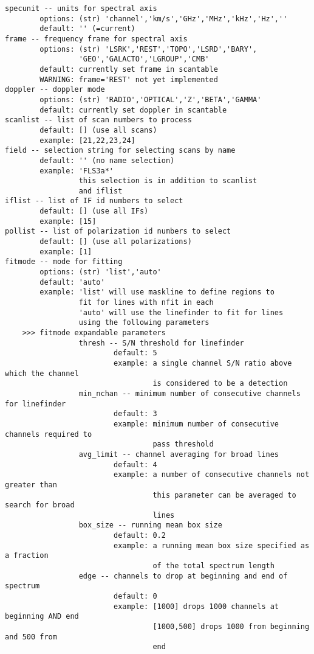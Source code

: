 \begin{verbatim}
specunit -- units for spectral axis
        options: (str) 'channel','km/s','GHz','MHz','kHz','Hz',''
        default: '' (=current)
frame -- frequency frame for spectral axis
        options: (str) 'LSRK','REST','TOPO','LSRD','BARY',
                 'GEO','GALACTO','LGROUP','CMB'
        default: currently set frame in scantable
        WARNING: frame='REST' not yet implemented
doppler -- doppler mode
        options: (str) 'RADIO','OPTICAL','Z','BETA','GAMMA'
        default: currently set doppler in scantable
scanlist -- list of scan numbers to process
        default: [] (use all scans)
        example: [21,22,23,24]
field -- selection string for selecting scans by name
        default: '' (no name selection)
        example: 'FLS3a*'
                 this selection is in addition to scanlist
                 and iflist
iflist -- list of IF id numbers to select
        default: [] (use all IFs)
        example: [15]
pollist -- list of polarization id numbers to select
        default: [] (use all polarizations)
        example: [1]
fitmode -- mode for fitting
        options: (str) 'list','auto'
        default: 'auto'
        example: 'list' will use maskline to define regions to
                 fit for lines with nfit in each
                 'auto' will use the linefinder to fit for lines
                 using the following parameters
    >>> fitmode expandable parameters             
                 thresh -- S/N threshold for linefinder
                         default: 5
                         example: a single channel S/N ratio above which the channel  
                                  is considered to be a detection
                 min_nchan -- minimum number of consecutive channels for linefinder
                         default: 3
                         example: minimum number of consecutive channels required to  
                                  pass threshold
                 avg_limit -- channel averaging for broad lines
                         default: 4
                         example: a number of consecutive channels not greater than
                                  this parameter can be averaged to search for broad 
                                  lines
                 box_size -- running mean box size
                         default: 0.2
                         example: a running mean box size specified as a fraction
                                  of the total spectrum length
                 edge -- channels to drop at beginning and end of spectrum
                         default: 0
                         example: [1000] drops 1000 channels at beginning AND end
                                  [1000,500] drops 1000 from beginning and 500 from 
                                  end
        

\end{verbatim}
